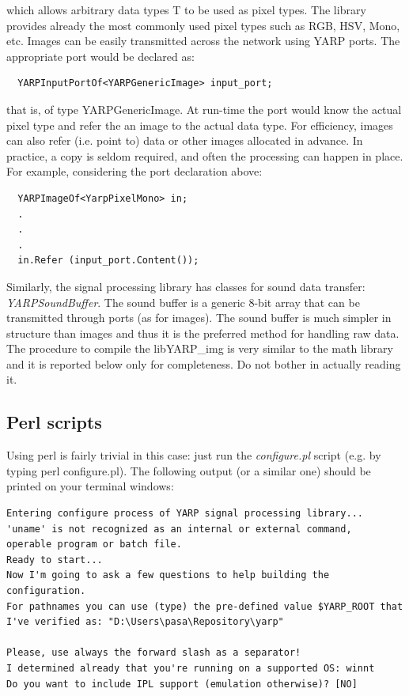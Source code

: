 \noindent which allows arbitrary data types T to be used as pixel types. The library provides already the most commonly used pixel types such as RGB, HSV, Mono, etc. Images can be easily transmitted across the network using YARP ports. The appropriate port would be declared as:

\begin{verbatim}
  YARPInputPortOf<YARPGenericImage> input_port;
\end{verbatim}

\noindent that is, of type YARPGenericImage. At run-time the port would know the actual pixel type and refer the an image to the actual data type. For efficiency, images can also refer (i.e. point to) data or other images allocated in advance. In practice, a copy is seldom required, and often the processing can happen in place. For example, considering the port declaration above:

\begin{verbatim}
  YARPImageOf<YarpPixelMono> in;
  .
  .
  .
  in.Refer (input_port.Content());	
\end{verbatim}

Similarly, the signal processing library has classes for sound data transfer: {\em YARPSoundBuffer}. The sound buffer is a generic 8-bit array that can be transmitted through ports (as for images). The sound buffer is much simpler in structure than images and thus it is the preferred method for handling raw data. The procedure to compile the libYARP\_img is very similar to the math library and it is reported below only for completeness. Do not bother in actually reading it.

\subsection{Perl scripts}
Using perl is fairly trivial in this case: just run the {\em configure.pl} script (e.g. by typing perl configure.pl). The following output (or a similar one) should be printed on your terminal windows:

\begin{verbatim}
Entering configure process of YARP signal processing library...
'uname' is not recognized as an internal or external command,
operable program or batch file.
Ready to start...
Now I'm going to ask a few questions to help building the configuration. 
For pathnames you can use (type) the pre-defined value $YARP_ROOT that 
I've verified as: "D:\Users\pasa\Repository\yarp"

Please, use always the forward slash as a separator!
I determined already that you're running on a supported OS: winnt
Do you want to include IPL support (emulation otherwise)? [NO]
\end{verbatim}

